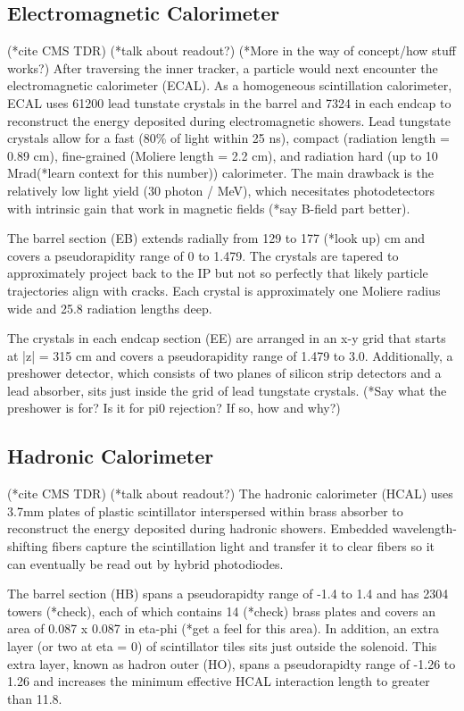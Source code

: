 \documentclass[12pt]{article}
\begin{document}
\subsection{Electromagnetic Calorimeter}
    (*cite CMS TDR)
    (*talk about readout?)
    (*More in the way of concept/how stuff works?)
    After traversing the inner tracker, a particle would next encounter the electromagnetic calorimeter (ECAL). As a homogeneous scintillation calorimeter, ECAL uses 61200 lead tunstate crystals in the barrel and 7324 in each endcap to reconstruct the energy deposited during electromagnetic showers. Lead tungstate crystals allow for a fast (80\% of light within 25 ns), compact (radiation length = 0.89 cm), fine-grained (Moliere length = 2.2 cm), and radiation hard (up to 10 Mrad(*learn context for this number)) calorimeter. The main drawback is the relatively low light yield (30 photon / MeV), which necesitates photodetectors with intrinsic gain that work in magnetic fields (*say B-field part better). 

    The barrel section (EB) extends radially from 129 to 177 (*look up) cm and covers a pseudorapidity range of 0 to 1.479. The crystals are tapered to approximately project back to the IP but not so perfectly that likely particle trajectories align with cracks. Each crystal is approximately one Moliere radius wide and 25.8 radiation lengths deep.

    The crystals in each endcap section (EE) are arranged in an x-y grid that starts at |z| = 315 cm and covers a pseudorapidity range of 1.479 to 3.0. Additionally, a preshower detector, which consists of two planes of silicon strip detectors and a lead absorber, sits just inside the grid of lead tungstate crystals. (*Say what the preshower is for? Is it for pi0 rejection? If so, how and why?)

\subsection{Hadronic Calorimeter}
    (*cite CMS TDR)
    (*talk about readout?)
    The hadronic calorimeter (HCAL) uses 3.7mm plates of plastic scintillator interspersed within brass absorber to reconstruct the energy deposited during hadronic showers. Embedded wavelength-shifting fibers capture the scintillation light and transfer it to clear fibers so it can eventually be read out by hybrid photodiodes.

    The barrel section (HB) spans a pseudorapidty range of -1.4 to 1.4 and has 2304 towers (*check), each of which contains 14 (*check) brass plates and covers an area of 0.087 x 0.087 in eta-phi (*get a feel for this area). In addition, an extra layer (or two at eta = 0) of scintillator tiles sits just outside the solenoid. This extra layer, known as hadron outer (HO), spans a pseudorapidty range of -1.26 to 1.26 and increases the minimum effective HCAL interaction length to greater than 11.8.
\end{document}
